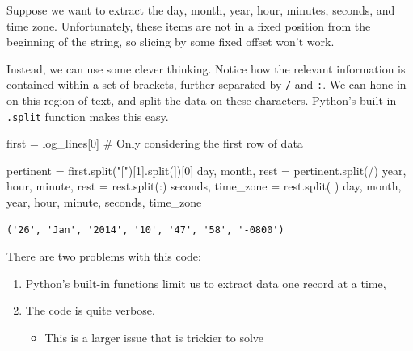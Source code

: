 \documentclass[
  letterpaper,
  DIV=11,
  numbers=noendperiod]{scrreprt}
\newenvironment{Shaded}{\begin{snugshade}}{\end{snugshade}}
\newcommand{\CommentTok}[1]{\textcolor[rgb]{0.37,0.37,0.37}{#1}}
\newcommand{\DecValTok}[1]{\textcolor[rgb]{0.68,0.00,0.00}{#1}}
\newcommand{\NormalTok}[1]{\textcolor[rgb]{0.00,0.23,0.31}{#1}}
\newcommand{\OperatorTok}[1]{\textcolor[rgb]{0.37,0.37,0.37}{#1}}
\newcommand{\StringTok}[1]{\textcolor[rgb]{0.13,0.47,0.30}{#1}}
\providecommand{\tightlist}{%
  \setlength{\itemsep}{0pt}\setlength{\parskip}{0pt}}\usepackage{longtable,booktabs,array}
\begin{document}
Suppose we want to extract the day, month, year, hour, minutes, seconds,
and time zone. Unfortunately, these items are not in a fixed position
from the beginning of the string, so slicing by some fixed offset won't
work.

Instead, we can use some clever thinking. Notice how the relevant
information is contained within a set of brackets, further separated by
\texttt{/} and \texttt{:}. We can hone in on this region of text, and
split the data on these characters. Python's built-in \texttt{.split}
function makes this easy.

\begin{Shaded}
\begin{Highlighting}[]
\NormalTok{first }\OperatorTok{=}\NormalTok{ log\_lines[}\DecValTok{0}\NormalTok{] }\CommentTok{\# Only considering the first row of data}

\NormalTok{pertinent }\OperatorTok{=}\NormalTok{ first.split(}\StringTok{"["}\NormalTok{)[}\DecValTok{1}\NormalTok{].split(}\StringTok{\textquotesingle{}]\textquotesingle{}}\NormalTok{)[}\DecValTok{0}\NormalTok{]}
\NormalTok{day, month, rest }\OperatorTok{=}\NormalTok{ pertinent.split(}\StringTok{\textquotesingle{}/\textquotesingle{}}\NormalTok{)}
\NormalTok{year, hour, minute, rest }\OperatorTok{=}\NormalTok{ rest.split(}\StringTok{\textquotesingle{}:\textquotesingle{}}\NormalTok{)}
\NormalTok{seconds, time\_zone }\OperatorTok{=}\NormalTok{ rest.split(}\StringTok{\textquotesingle{} \textquotesingle{}}\NormalTok{)}
\NormalTok{day, month, year, hour, minute, seconds, time\_zone}
\end{Highlighting}
\end{Shaded}

\begin{verbatim}
('26', 'Jan', '2014', '10', '47', '58', '-0800')
\end{verbatim}

There are two problems with this code:

\begin{enumerate}
\def\labelenumi{\arabic{enumi}.}
\tightlist
\item
  Python's built-in functions limit us to extract data one record at a
  time,
\item
  The code is quite verbose.

  \begin{itemize}
  \tightlist
  \item
    This is a larger issue that is trickier to solve
  \end{itemize}
\end{enumerate}
\end{document}
